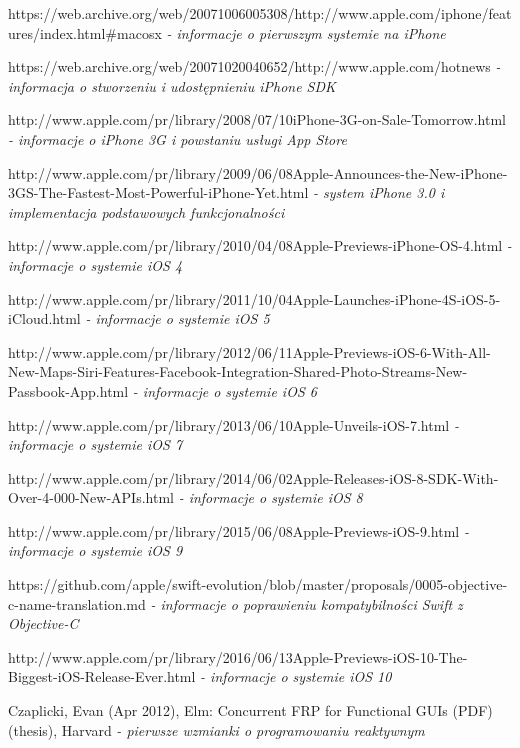\documentclass[12pt,oneside,a4paper]{report}
\begin{document}
\begin{thebibliography}{50}
 https://web.archive.org/web/20071006005308/http://www.apple.com/iphone/features/index.html\#macosx
\emph{ - informacje o pierwszym systemie na iPhone}

 https://web.archive.org/web/20071020040652/http://www.apple.com/hotnews
\emph{ - informacja o stworzeniu i udostępnieniu iPhone SDK}

 http://www.apple.com/pr/library/2008/07/10iPhone-3G-on-Sale-Tomorrow.html
\emph{ - informacje o iPhone 3G i powstaniu usługi App Store}

 http://www.apple.com/pr/library/2009/06/08Apple-Announces-the-New-iPhone-3GS-The-Fastest-Most-Powerful-iPhone-Yet.html
\emph{ - system iPhone 3.0 i implementacja podstawowych funkcjonalności}

http://www.apple.com/pr/library/2010/04/08Apple-Previews-iPhone-OS-4.html
\emph{ - informacje o systemie iOS 4}

http://www.apple.com/pr/library/2011/10/04Apple-Launches-iPhone-4S-iOS-5-iCloud.html
\emph{ - informacje o systemie iOS 5}

http://www.apple.com/pr/library/2012/06/11Apple-Previews-iOS-6-With-All-New-Maps-Siri-Features-Facebook-Integration-Shared-Photo-Streams-New-Passbook-App.html
\emph{ - informacje o systemie iOS 6}

http://www.apple.com/pr/library/2013/06/10Apple-Unveils-iOS-7.html
\emph{ - informacje o systemie iOS 7}

http://www.apple.com/pr/library/2014/06/02Apple-Releases-iOS-8-SDK-With-Over-4-000-New-APIs.html
\emph{ - informacje o systemie iOS 8}

http://www.apple.com/pr/library/2015/06/08Apple-Previews-iOS-9.html
\emph{ - informacje o systemie iOS 9}

https://github.com/apple/swift-evolution/blob/master/proposals/0005-objective-c-name-translation.md
\emph{ - informacje o poprawieniu kompatybilności Swift z Objective-C}

http://www.apple.com/pr/library/2016/06/13Apple-Previews-iOS-10-The-Biggest-iOS-Release-Ever.html
\emph{ - informacje o systemie iOS 10}

 Czaplicki, Evan (Apr 2012), Elm: Concurrent FRP for Functional GUIs (PDF) (thesis), Harvard
\emph{ - pierwsze wzmianki o programowaniu reaktywnym}


\end{thebibliography}
\end{document}
